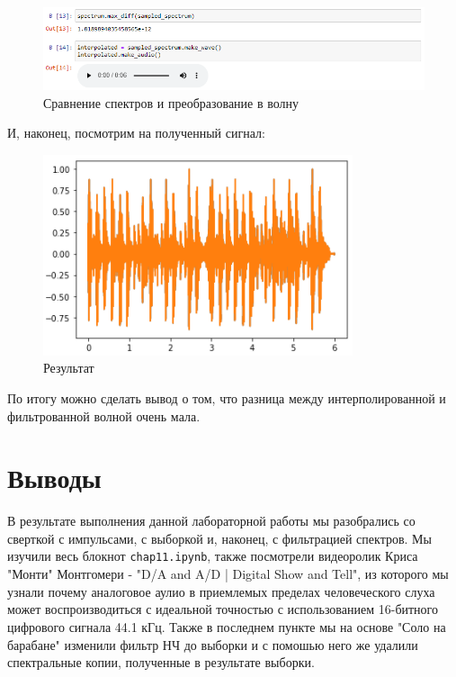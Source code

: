\documentclass[a4paper]{article}
\begin{document}
            \begin{figure}[H]
                \centering
                \includegraphics[width=\textwidth]{ex_3_9.png}
                \caption{Сравнение спектров и преобразование в волну}
                \label{fig:ex_3_9}
            \end{figure}
            
            И, наконец, посмотрим на полученный сигнал:
            
            \begin{figure}[H]
                \centering
                \includegraphics{ex_3_10.png}
                \caption{Результат}
                \label{fig:ex_3_10}
            \end{figure}
            
            По итогу можно сделать вывод о том, что разница между интерполированной и фильтрованной волной очень мала.
            
    \newpage
        \section{Выводы}
             В результате выполнения данной лабораторной работы мы разобрались со сверткой с импульсами, с выборкой и, наконец, с фильтрацией спектров. Мы изучили весь блокнот \texttt{chap11.ipynb}, также посмотрели видеоролик Криса "Монти" Монтгомери - "D/A and A/D | Digital Show and Tell", из которого мы узнали почему аналоговое аулио в приемлемых пределах человеческого слуха может воспроизводиться с идеальной точностью с использованием 16-битного цифрового сигнала 44.1 кГц. Также в последнем пункте мы на основе "Соло на барабане"  изменили фильтр НЧ до выборки и с помошью него же удалили спектральные копии, полученные в результате выборки.
             
\end{document}
